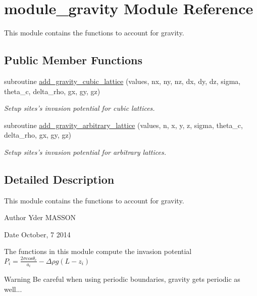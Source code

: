 \hypertarget{classmodule__gravity}{
\section{module\-\_\-gravity \-Module \-Reference}
\label{classmodule__gravity}
}


\-This module contains the functions to account for gravity.  


\subsection*{\-Public \-Member \-Functions}
\begin{DoxyCompactItemize}
\item 
subroutine \hyperlink{classmodule__gravity_a0ef06b39c155a8de1baa8cd15c38da9d}{add\-\_\-gravity\-\_\-cubic\-\_\-lattice} (values, nx, ny, nz, dx, dy, dz, sigma, theta\-\_\-c, delta\-\_\-rho, gx, gy, gz)
\begin{DoxyCompactList}\small\item\em \-Setup sites's invasion potential for cubic lattices. \end{DoxyCompactList}\item 
subroutine \hyperlink{classmodule__gravity_aec4d82af2ee63137ace94fec23131058}{add\-\_\-gravity\-\_\-arbitrary\-\_\-lattice} (values, n, x, y, z, sigma, theta\-\_\-c, delta\-\_\-rho, gx, gy, gz)
\begin{DoxyCompactList}\small\item\em \-Setup sites's invasion potential for arbitrary lattices. \end{DoxyCompactList}\end{DoxyCompactItemize}


\subsection{\-Detailed \-Description}
\-This module contains the functions to account for gravity. 

\begin{DoxyAuthor}{\-Author}
\-Yder \-M\-A\-S\-S\-O\-N 
\end{DoxyAuthor}
\begin{DoxyDate}{\-Date}
\-October, 7 2014
\end{DoxyDate}
\-The functions in this module compute the invasion potential $ P_i = \frac{2 \sigma \mbox{cos} \theta_c}{a_i}-\Delta \rho g (L-z_i)$ \begin{DoxyWarning}{\-Warning}
\-Be careful when using periodic boundaries, gravity gets periodic as well... 
\end{DoxyWarning}


